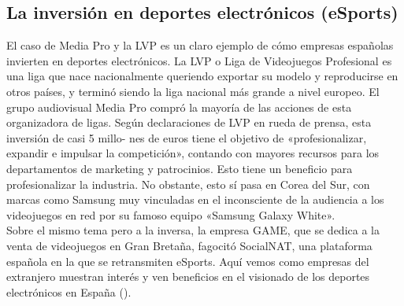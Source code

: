 \documentclass[a4paper,11pt]{article}
\begin{document}
\subsection{La inversión en deportes electrónicos (eSports)}
El caso de Media Pro y la LVP es un claro ejemplo de cómo empresas españolas invierten en deportes electrónicos. La LVP o Liga de Videojuegos Profesional es una liga que nace nacionalmente queriendo exportar su modelo y reproducirse en otros países, y terminó siendo la liga nacional más grande a nivel europeo. El grupo audiovisual Media Pro compró la mayoría de las acciones de esta organizadora de ligas. Según declaraciones de LVP en rueda de prensa, esta inversión de casi 5 millo- nes de euros tiene el objetivo de «profesionalizar, expandir e impulsar la competición», contando con mayores recursos para los departamentos de marketing y patrocinios. Esto tiene un beneficio para profesionalizar la industria.  No obstante, esto sí pasa en Corea del Sur, con marcas como Samsung muy vinculadas en el inconsciente de la audiencia a los videojuegos en red por su famoso equipo «Samsung Galaxy White».\\
Sobre el mismo tema pero a la inversa, la empresa GAME, que se dedica a la venta de videojuegos en Gran Bretaña, fagocitó SocialNAT, una plataforma española en la que se retransmiten eSports. Aquí vemos como empresas del extranjero muestran interés y ven beneficios en el visionado de los deportes electrónicos en España (\cite{Erik2015}).
\end{document}
